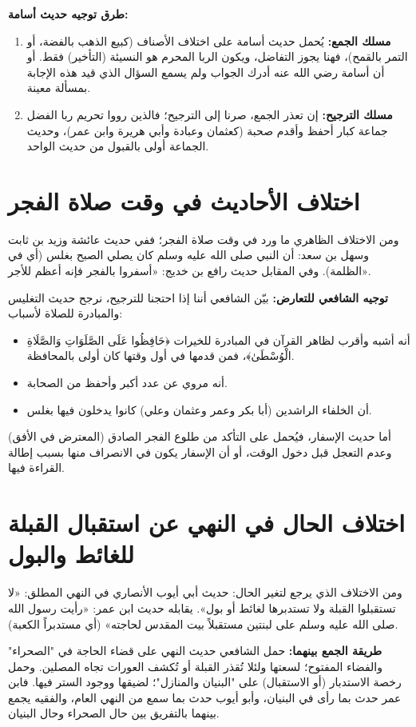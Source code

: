 \textbf{طرق توجيه حديث أسامة:}
\begin{enumerate}
    \item \textbf{مسلك الجمع:} يُحمل حديث أسامة على اختلاف الأصناف (كبيع الذهب بالفضة، أو التمر بالقمح)، فهنا يجوز التفاضل، ويكون الربا المحرم هو النسيئة (التأخير) فقط. أو أن أسامة رضي الله عنه أدرك الجواب ولم يسمع السؤال الذي قيد هذه الإجابة بمسألة معينة.
    \item \textbf{مسلك الترجيح:} إن تعذر الجمع، صرنا إلى الترجيح؛ فالذين رووا تحريم ربا الفضل جماعة كبار أحفظ وأقدم صحبة (كعثمان وعبادة وأبي هريرة وابن عمر)، وحديث الجماعة أولى بالقبول من حديث الواحد.
\end{enumerate}

\section{اختلاف الأحاديث في وقت صلاة الفجر}
ومن الاختلاف الظاهري ما ورد في وقت صلاة الفجر؛ ففي حديث عائشة وزيد بن ثابت وسهل بن سعد: أن النبي صلى الله عليه وسلم كان يصلي الصبح بغلس (أي في الظلمة). وفي المقابل حديث رافع بن خديج: «أسفروا بالفجر فإنه أعظم للأجر». 

\textbf{توجيه الشافعي للتعارض:}
بيّن الشافعي أننا إذا احتجنا للترجيح، نرجح حديث التغليس والمبادرة للصلاة لأسباب:
\begin{itemize}
    \item أنه أشبه وأقرب لظاهر القرآن في المبادرة للخيرات ﴿حَافِظُوا عَلَى الصَّلَوَاتِ وَالصَّلَاةِ الْوُسْطَىٰ﴾، فمن قدمها في أول وقتها كان أولى بالمحافظة.
    \item أنه مروي عن عدد أكبر وأحفظ من الصحابة.
    \item أن الخلفاء الراشدين (أبا بكر وعمر وعثمان وعلي) كانوا يدخلون فيها بغلس.
\end{itemize}
أما حديث الإسفار، فيُحمل على التأكد من طلوع الفجر الصادق (المعترض في الأفق) وعدم التعجل قبل دخول الوقت، أو أن الإسفار يكون في الانصراف منها بسبب إطالة القراءة فيها.

\section{اختلاف الحال في النهي عن استقبال القبلة للغائط والبول}
ومن الاختلاف الذي يرجع لتغير الحال: حديث أبي أيوب الأنصاري في النهي المطلق: «لا تستقبلوا القبلة ولا تستدبرها لغائط أو بول». يقابله حديث ابن عمر: «رأيت رسول الله صلى الله عليه وسلم على لبنتين مستقبلاً بيت المقدس لحاجته» (أي مستدبراً الكعبة).

\textbf{طريقة الجمع بينهما:} 
حمل الشافعي حديث النهي على قضاء الحاجة في "الصحراء" والفضاء المفتوح؛ لسعتها ولئلا تُقذر القبلة أو تُكشف العورات تجاه المصلين. وحمل رخصة الاستدبار (أو الاستقبال) على "البنيان والمنازل"؛ لضيقها ووجود الستر فيها. فابن عمر حدث بما رأى في البنيان، وأبو أيوب حدث بما سمع من النهي العام، والفقيه يجمع بينهما بالتفريق بين حال الصحراء وحال البنيان.

